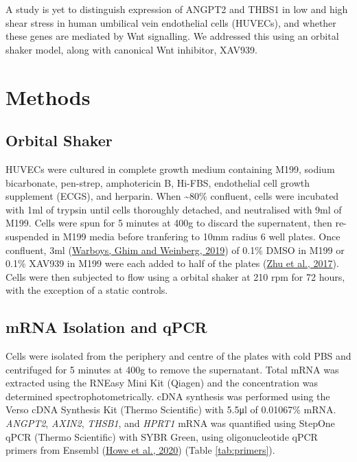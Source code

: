\documentclass[
  12pt,
]{article}
\begin{document}
A study is yet to distinguish expression of ANGPT2 and THBS1 in low and high shear stress in human umbilical vein endothelial cells (HUVECs), and whether these genes are mediated by Wnt signalling. We addressed this using an orbital shaker model, along with canonical Wnt inhibitor, XAV939.

\hypertarget{methods}{%
\section{Methods}\label{methods}}

\hypertarget{orbital-shaker}{%
\subsection{Orbital Shaker}\label{orbital-shaker}}

HUVECs were cultured in complete growth medium containing M199, sodium bicarbonate, pen-strep, amphotericin B, Hi-FBS, endothelial cell growth supplement (ECGS), and herparin. When \textasciitilde80\% confluent, cells were incubated with 1ml of trypsin until cells thoroughly detached, and neutralised with 9ml of M199. Cells were spun for 5 minutes at 400g to discard the supernatent, then re-suspended in M199 media before tranfering to 10mm radius 6 well plates. Once confluent, 3ml (\protect\hyperlink{ref-Warboys2019}{Warboys, Ghim and Weinberg, 2019}) of 0.1\% DMSO in M199 or 0.1\% XAV939 in M199 were each added to half of the plates (\protect\hyperlink{ref-Zhu2017}{Zhu et al., 2017}). Cells were then subjected to flow using a orbital shaker at 210 rpm for 72 hours, with the exception of a static controls.

\hypertarget{mrna-isolation-and-qpcr}{%
\subsection{mRNA Isolation and qPCR}\label{mrna-isolation-and-qpcr}}

Cells were isolated from the periphery and centre of the plates with cold PBS and centrifuged for 5 minutes at 400g to remove the supernatant. Total mRNA was extracted using the RNEasy Mini Kit (Qiagen) and the concentration was determined spectrophotometrically. cDNA synthesis was performed using the Verso cDNA Synthesis Kit (Thermo Scientific) with 5.5μl of 0.01067\% mRNA. \emph{ANGPT2}, \emph{AXIN2}, \emph{THSB1}, and \emph{HPRT1} mRNA was quantified using StepOne qPCR (Thermo Scientific) with SYBR Green, using oligonucleotide qPCR primers from Ensembl (\protect\hyperlink{ref-howe2020}{Howe et al., 2020}) (Table \ref{tab:primers}).
\end{document}
